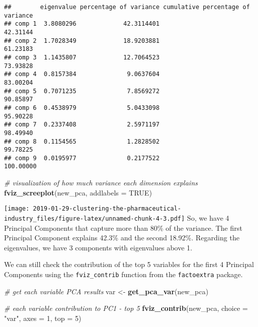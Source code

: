 \documentclass[]{article}
\newenvironment{Shaded}{\begin{snugshade}}{\end{snugshade}}
\newcommand{\KeywordTok}[1]{\textcolor[rgb]{0.13,0.29,0.53}{\textbf{#1}}}
\newcommand{\DataTypeTok}[1]{\textcolor[rgb]{0.13,0.29,0.53}{#1}}
\newcommand{\DecValTok}[1]{\textcolor[rgb]{0.00,0.00,0.81}{#1}}
\newcommand{\StringTok}[1]{\textcolor[rgb]{0.31,0.60,0.02}{#1}}
\newcommand{\CommentTok}[1]{\textcolor[rgb]{0.56,0.35,0.01}{\textit{#1}}}
\newcommand{\OtherTok}[1]{\textcolor[rgb]{0.56,0.35,0.01}{#1}}
\newcommand{\NormalTok}[1]{#1}
\begin{document}
\begin{verbatim}
##        eigenvalue percentage of variance cumulative percentage of variance
## comp 1  3.8080296             42.3114401                          42.31144
## comp 2  1.7028349             18.9203881                          61.23183
## comp 3  1.1435807             12.7064523                          73.93828
## comp 4  0.8157384              9.0637604                          83.00204
## comp 5  0.7071235              7.8569272                          90.85897
## comp 6  0.4538979              5.0433098                          95.90228
## comp 7  0.2337408              2.5971197                          98.49940
## comp 8  0.1154565              1.2828502                          99.78225
## comp 9  0.0195977              0.2177522                         100.00000
\end{verbatim}

\begin{Shaded}
\begin{Highlighting}[]
\CommentTok{# visualization of how much variance each dimension explains}
\KeywordTok{fviz_screeplot}\NormalTok{(new_pca, }\DataTypeTok{addlabels =} \OtherTok{TRUE}\NormalTok{)}
\end{Highlighting}
\end{Shaded}

\texttt{[image: 2019-01-29-clustering-the-pharmaceutical-industry\_files/figure-latex/unnamed-chunk-4-3.pdf]}
So, we have 4 Principal Components that capture more than 80\% of the
variance. The first Principal Component explains 42.3\% and the second
18.92\%. Regarding the eigenvalues, we have 3 components with
eigenvalues above 1.

We can still check the contribution of the top 5 variables for the first
4 Principal Components using the \texttt{fviz\_contrib} function from
the \texttt{factoextra} package.

\begin{Shaded}
\begin{Highlighting}[]
\CommentTok{# get each variable PCA results}
\NormalTok{var <-}\StringTok{ }\KeywordTok{get_pca_var}\NormalTok{(new_pca)}

\CommentTok{# each variable contribution to PC1 - top 5}
\KeywordTok{fviz_contrib}\NormalTok{(new_pca, }\DataTypeTok{choice =} \StringTok{"var"}\NormalTok{, }\DataTypeTok{axes =} \DecValTok{1}\NormalTok{, }\DataTypeTok{top =} \DecValTok{5}\NormalTok{)}
\end{Highlighting}
\end{Shaded}
\end{document}
